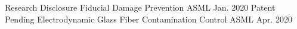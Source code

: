 

\begin{cventries}

  \cventry
    {Research Disclosure} %
    {Fiducial Damage Prevention} %
    {ASML} %
    {Jan. 2020} %
    {}
  \cventry
	{Patent Pending} %
	{Electrodynamic Glass Fiber Contamination Control} %
	{ASML} %
	{Apr. 2020} %
	{}

\end{cventries}
